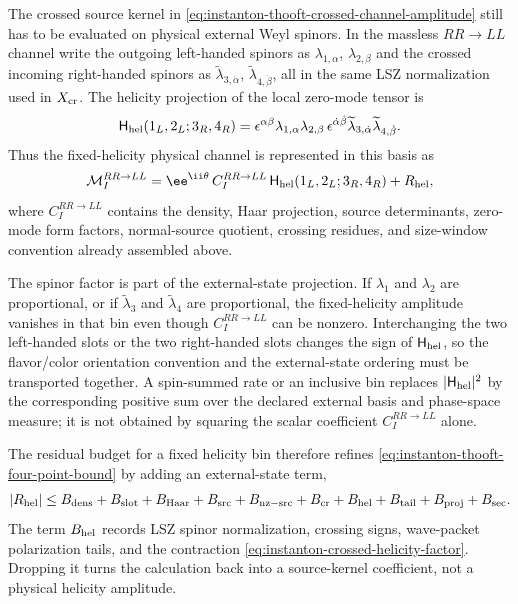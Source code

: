 \begin{construction}
\label{constr:instanton-crossed-helicity-projection}
The crossed source kernel in
\eqref{eq:instanton-thooft-crossed-channel-amplitude} still has to be
evaluated on physical external Weyl spinors.  In the massless \(RR\to LL\)
channel write the outgoing left-handed spinors as
\(\lambda_{1,\alpha}\), \(\lambda_{2,\beta}\) and the crossed incoming
right-handed spinors as \(\widetilde\lambda_{3,\dot\alpha}\),
\(\widetilde\lambda_{4,\dot\beta}\), all in the same LSZ normalization used
in \(X_{\rm cr}\).  The helicity projection of the local zero-mode tensor is
\begin{equation}
  \mathsf H_{\rm hel}(1_L,2_L;3_R,4_R)
  =
  \epsilon^{\alpha\beta}\lambda_{1,\alpha}\lambda_{2,\beta}\,
  \epsilon^{\dot\alpha\dot\beta}
  \widetilde\lambda_{3,\dot\alpha}\widetilde\lambda_{4,\dot\beta}.
  \label{eq:instanton-crossed-helicity-factor}
\end{equation}
Thus the fixed-helicity physical channel is represented in this basis as
\begin{equation}
  \mathcal M_I^{RR\to LL}
  =
  \ee^{\ii\theta}\,
  C_I^{RR\to LL}\,
  \mathsf H_{\rm hel}(1_L,2_L;3_R,4_R)
  +R_{\rm hel},
  \label{eq:instanton-crossed-helicity-amplitude}
\end{equation}
where \(C_I^{RR\to LL}\) contains the density, Haar projection, source
determinants, zero-mode form factors, normal-source quotient, crossing
residues, and size-window convention already assembled above.

The spinor factor is part of the external-state projection.  If
\(\lambda_1\) and \(\lambda_2\) are proportional, or if
\(\widetilde\lambda_3\) and \(\widetilde\lambda_4\) are proportional, the
fixed-helicity amplitude vanishes in that bin even though
\(C_I^{RR\to LL}\) can be nonzero.  Interchanging the two left-handed slots or
the two right-handed slots changes the sign of
\(\mathsf H_{\rm hel}\), so the flavor/color orientation convention and the
external-state ordering must be transported together.  A spin-summed rate or
an inclusive bin replaces
\(|\mathsf H_{\rm hel}|^2\) by the corresponding positive sum over the
declared external basis and phase-space measure; it is not obtained by
squaring the scalar coefficient \(C_I^{RR\to LL}\) alone.

The residual budget for a fixed helicity bin therefore refines
\eqref{eq:instanton-thooft-four-point-bound} by adding an external-state term,
\[
  |R_{\rm hel}|
  \le
  B_{\rm dens}+B_{\rm slot}+B_{\rm Haar}+B_{\rm src}
  +B_{\rm nz-src}+B_{\rm cr}+B_{\rm hel}+B_{\rm tail}+B_{\rm proj}+B_{\rm sec}.
\]
The term \(B_{\rm hel}\) records LSZ spinor normalization, crossing signs,
wave-packet polarization tails, and the contraction
\eqref{eq:instanton-crossed-helicity-factor}.  Dropping it turns the
calculation back into a source-kernel coefficient, not a physical helicity
amplitude.
\end{construction}

